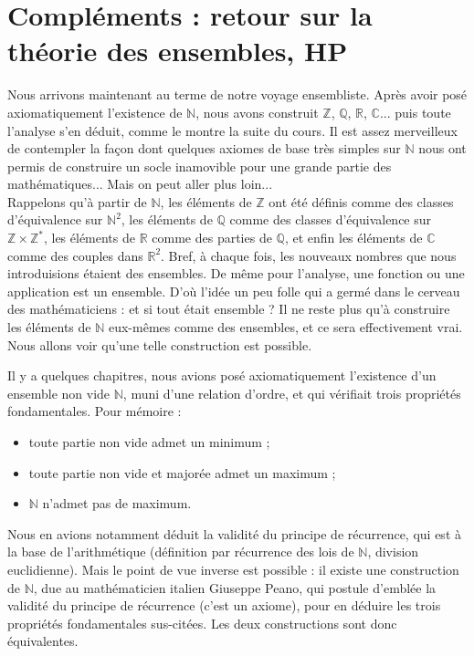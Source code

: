 \documentclass[french]{book}
\theoremstyle{plain}
\theoremstyle{definition}
\theoremstyle{remark}
\begin{document}
\section{Compléments : retour sur la théorie des ensembles, HP}
Nous arrivons maintenant au terme de notre voyage ensembliste. Après avoir posé axiomatiquement l'existence de $\mathbb{N}$, nous avons construit $\mathbb{Z}$, $\mathbb{Q}$, $\mathbb{R}$, $\mathbb{C}$... puis toute l'analyse s'en déduit, comme le montre la suite du cours. Il est assez merveilleux de contempler la façon dont quelques axiomes de base très simples sur $\mathbb{N}$ nous ont permis de construire un socle inamovible pour une grande partie des mathématiques... Mais on peut aller plus loin...\\

Rappelons qu'à partir de $\mathbb{N}$, les éléments de $\mathbb{Z}$ ont été définis comme des classes d'équivalence sur $\mathbb{N}^2$, les éléments de $\mathbb{Q}$ comme des classes d'équivalence sur $\mathbb{Z} \times \mathbb{Z}^*$, les éléments de $\mathbb{R}$ comme des parties de $\mathbb{Q}$, et enfin les éléments de $\mathbb{C}$ comme des couples dans $\mathbb{R}^2$. Bref, à chaque fois, les nouveaux nombres que nous introduisions étaient des ensembles. De même pour l'analyse, une fonction ou une application est un ensemble. D'où l'idée un peu folle qui a germé dans le cerveau des mathématiciens : et si tout était ensemble ? Il ne reste plus qu'à construire les éléments de $\mathbb{N}$ eux-mêmes comme des ensembles, et ce sera effectivement vrai. Nous allons voir qu'une telle construction est possible. \\ \par

Il y a quelques chapitres, nous avions posé axiomatiquement l'existence d'un ensemble non vide $\mathbb{N}$, muni d'une relation d'ordre, et qui vérifiait trois propriétés fondamentales. Pour mémoire :
\begin{itemize}
	\item toute partie non vide admet un minimum ;
	\item toute partie non vide et majorée admet un maximum ;
	\item $\mathbb{N}$ n'admet pas de maximum.
\end{itemize}
Nous en avions notamment déduit la validité du principe de récurrence, qui est à la base de l'arithmétique (définition par récurrence des lois de $\mathbb{N}$, division euclidienne). Mais le point de vue inverse est possible : il existe une construction de $\mathbb{N}$, due au mathématicien italien Giuseppe Peano, qui postule d'emblée la validité du principe de récurrence (c'est un axiome), pour en déduire les trois propriétés fondamentales sus-citées. Les deux constructions sont donc équivalentes.\\
\end{document}
